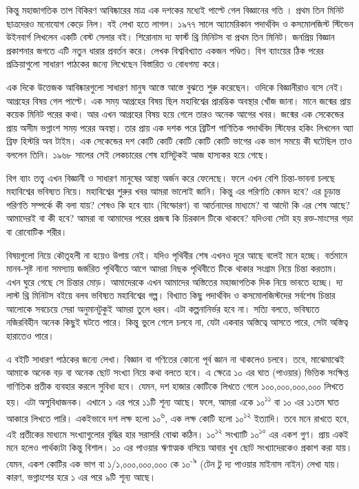 \documentclass[
]{book}
\begin{document}
কিন্তু মহাজাগতিক তাপ বিকিরণ আবিষ্কারের মাত্র এক দশকের মধ্যেই পাল্টে গেল বিজ্ঞানের গতি । প্রথম তিন মিনিট ছাত্রদেরও মনোযোগ কেড়ে নিল। বই লেখা হতে লাগল। ১৯৭৭ সালে অ্যামেরিকান পদার্থবিদ ও কসমোলজিস্ট স্টিভেন উইনবার্গ লিখলেন একটি বেস্ট সেলার বই। শিরোনাম দ্য ফার্স্ট থ্রি মিনিটস বা প্রথম তিন মিনিট। জনপ্রিয় বিজ্ঞান প্রকাশনার জগতে এটি নতুন ধারার প্রবর্তন করে। লেখক বিশ্ববিখ্যাত একজন পণ্ডিত। বিগ ব্যাংয়ের ঠিক পরের প্রক্রিয়াগুলো সাধারণ পাঠকের জন্যে লিখেছেন বিস্তারিত ও বোধগম্য করে।

এক দিকে উত্তেজক আবিষ্কারগুলো সাধারণ মানুষ আস্তে আস্তে বুঝতে শুরু করেছেন। ওদিকে বিজ্ঞানীরাও বসে নেই। আগ্রহের বিষয় গেল পাল্টে। এক সময় আগ্রহের বিষয় ছিল মহাবিশ্বের প্রারম্ভিক অবস্থার খোঁজ জানা। মানে জন্মের প্রায় কয়েক মিনিট পরের কথা। আর এখন আগ্রহের বিষয় হয়ে গেলে তারও অনেক আগের খবর। জন্মের এক সেকেন্ডের প্রায় অসীম ভগ্নাংশ সময় পরের অবস্থা। তার প্রায় এক দশক পরে ব্রিটিশ গাণিতিক পদার্থবিদ স্টিফের হকিং লিখলেন অ্যা ব্রিফ হিস্টরি অব টাইম। এক সেকেন্ডের দশ কোটি কোটি কোটি কোটি কোটি ভাগের এক ভাগ সময়ে কী ঘটেছিল তাও বললেন তিনি। ১৯৬৮ সালের সেই লেকচারের শেষ হাসিটুকই আজ হাস্যকর হয়ে গেছে।

বিগ ব্যাং তত্ত্ব এখন বিজ্ঞানী ও সাধারণ মানুষের আস্থা অর্জন করে ফেলেছে। ফলে এখন বেশি চিন্তা-ভাবনা চলছে মহাবিশ্বের ভবিষ্যত নিয়ে। মহাবিশ্বের শুরুর খবর আমরা ভালোই জানি। কিন্তু এর পরিণতি কেমন হবে? এর চূড়ান্ত পরিণতি সম্পর্কে কী বলা যায়? শেষও কি হবে ব্যাং (বিস্ফোরণ) বা আর্তনাদের মাধ্যমে? বা আদৌ কি এর শেষ আছে? আমাদেরই বা কী হবে? আমরা বা আমাদের পরের প্রজন্ম কি চিরকাল টিকে থাকবে? যদিওবা সেটা হয় রক্ত-মাংসের গড়া বা রোবোটিক শরীর।

বিষয়গুলো নিয়ে কৌতূহলী না হয়েও উপায় নেই। যদিও পৃথিবীর শেষ এখনও দূরে আছে বলেই মনে হচ্ছে। বর্তমানে মানব-সৃষ্ট নানা সমস্যায় জর্জরিত পৃথিবীতে আগে আমরা নিছক পৃথিবীতে টিকে থাকার সংগ্রাম নিয়ে চিন্তা করতাম। এখন ঘুরে গেছে সে চিন্তার মোড়। আমাদেরকে এখন আমাদের অস্তিতের মহাজাগতিক দিক নিয়ে ভাবতে হচ্ছে। দ্য লাস্ট থ্রি মিনিটস বইয়ে বলব ভবিষ্যত মহাবিশ্বের গল্প। বিখ্যাত কিছু পদার্থবিদ ও কসমোলজিস্টদের সর্বশেষ চিন্তার আলোকে সবচেয়ে সেরা অনুমানটুকুই আমরা তুলে ধরব। এটা কল্পনানির্ভর হবে না। সত্যি বলতে, ভবিষ্যতে নজিরবিহীন অনেক কিছুই ঘটতে পারে। কিন্তু ভুলে গেলে চলবে না, যেটা একবার অস্তিত্বে আসতে পারে, সেটা অস্তিত্ব হারাতেও পারে।

এ বইটি সাধারণ পাঠকের জন্যে লেখা। বিজ্ঞান বা গণিতের কোনো পূর্ব জ্ঞান না থাকলেও চলবে। তবে, মাঝেমাঝেই আমাকে অনেক বড় বা অনেক ছোট সংখ্যা নিয়ে কথা বলতে হবে। এ ক্ষেত্রে ১০ এর ঘাত (পাওয়ার) ভিত্তিক সংক্ষিপ্ত গাণিতিক প্রতীক ব্যবহার করলে সুবিধা হবে। যেমন, দশ হাজার কোটিকে লিখতে গেলে ১০০,০০০,০০০,০০০ লিখতে হয়। এটা অসুবিধাজনক। এখানে ১ এর পরে ১১টি শূন্য আছে। ফলে, আমরা একে ১০\textsuperscript{১১} বা ১০ এর ১১তম ঘাত আকারে লিখতে পারি। একইভাবে দশ লক্ষ হলো ১০\textsuperscript{৬}, এক লক্ষ কোটি হলো ১০\textsuperscript{১২} ইত্যাদি। তবে মনে রাখতে হবে, এই প্রতীকের মাধ্যমে সংখ্যাগুলোর বৃদ্ধির হার সরাসরি বোঝা কঠিন। ১০\textsuperscript{১২} সংখ্যাটি ১০\textsuperscript{১০} এর একশ গুণ। প্রায় একই মনে হলেও পার্থক্যটা কিন্তু বিশাল। ১০ এর পাওয়ার ঋণাত্মক বসিয়ে আবার খুব ছোট সংখ্যাদেরকেও প্রকাশ করা যায়। যেমন, একশ কোটির এক ভাগ বা ১/১,০০০,০০০,০০০ কে ১০\textsuperscript{-৯} (টেন টু দ্য পাওয়ার মাইনাস নাইন) লেখা যায়। কারণ, ভগ্নাংশের হরে ১ এর পরে ৯টি শূন্য আছে।
\end{document}

